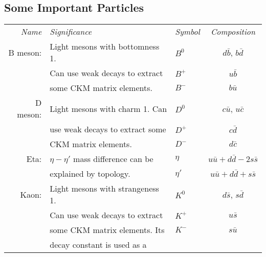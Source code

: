 \documentclass[12pt]{book}
\theoremstyle{definition}
\newenvironment{frontstuff}
  {\centering\chapter*{}}
  {\clearpage}
\begin{document}
\begin{frontstuff}
\section*{Some Important Particles}
\begin{tabularx}{\linewidth}{rLlc}
{\it Name} & {\it Significance} & {\it Symbol} & {\it Composition}
\vspace{2mm}\\
B meson: & Light mesons with bottomness 1.
                                     & $B^0$ &   $d\bar{b}$, 
                                                   $b\bar{d}$ \\
         & Can use weak decays to extract
                                     & $B^+$ &   $u\bar{b}$ \\
         & some CKM matrix elements. & $B^-$ &   $b\bar{u}$
\vspace{2mm}\\
D meson: & Light mesons with charm 1. Can
                                     & $D^0$ &   $c\bar{u}$, 
                                                   $u\bar{c}$ \\
         & use weak decays to extract some
                                     & $D^+$ &   $c\bar{d}$ \\
         & CKM matrix elements.      & $D^-$ &   $d\bar{c}$
\vspace{2mm}\\
Eta:     & $\eta-\eta'$ mass difference can be
                                     & $\eta$  &   $u\bar{u}
                                                   +d\bar{d}
                                                  -2s\bar{s}$ \\
         & explained by topology.    & $\eta'$ &   $u\bar{u}
                                                   +d\bar{d}
                                                   +s\bar{s}$
\vspace{2mm}\\
Kaon:    & Light mesons with strangeness 1.
                                     & $K^0$ &   $d\bar{s}$, 
                                                   $s\bar{d}$ \\
         & Can use weak decays to extract 
                                     & $K^+$ &   $u\bar{s}$ \\
         & some CKM matrix elements. Its 
                                     & $K^-$ &   $s\bar{u}$ \\
         & decay constant is used as a 
                                     &       &              \\

\end{tabularx}
\end{frontstuff}
\end{document}
